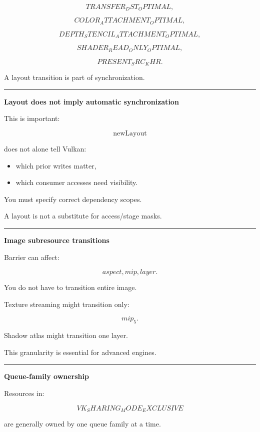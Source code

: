 \[
TRANSFER_DST_OPTIMAL,
\]

\[
COLOR_ATTACHMENT_OPTIMAL,
\]

\[
DEPTH_STENCIL_ATTACHMENT_OPTIMAL,
\]

\[
SHADER_READ_ONLY_OPTIMAL,
\]

\[
PRESENT_SRC_KHR.
\]

A layout transition is part of synchronization.

\begin{center}\rule{0.5\linewidth}{0.5pt}\end{center}

\textbf{Layout does not imply automatic synchronization}

This is important:

\[
\boxed{
\text{newLayout}
}
\]

does not alone tell Vulkan:

\begin{itemize}
\tightlist
\item
  which prior writes matter,
\item
  which consumer accesses need visibility.
\end{itemize}

You must specify correct dependency scopes.

A layout is not a substitute for access/stage masks.

\begin{center}\rule{0.5\linewidth}{0.5pt}\end{center}

\textbf{Image subresource transitions}

Barrier can affect:

\[
aspect,
mip,
layer.
\]

You do not have to transition entire image.

Texture streaming might transition only:

\[
mip_5.
\]

Shadow atlas might transition one layer.

This granularity is essential for advanced engines.

\begin{center}\rule{0.5\linewidth}{0.5pt}\end{center}

\textbf{Queue-family ownership}

Resources in:

\[
VK_SHARING_MODE_EXCLUSIVE
\]

are generally owned by one queue family at a time.

